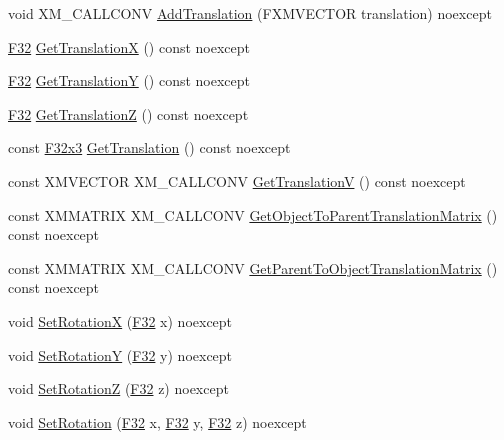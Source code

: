 \begin{DoxyCompactItemize}
\item 
void X\+M\+\_\+\+C\+A\+L\+L\+C\+O\+NV \hyperlink{classmage_1_1_local_transform_a43e89031fcab7af7e7fb1c7d80e06438}{Add\+Translation} (F\+X\+M\+V\+E\+C\+T\+OR translation) noexcept
\item 
\hyperlink{namespacemage_aa97e833b45f06d60a0a9c4fc22ae02c0}{F32} \hyperlink{classmage_1_1_local_transform_ae021c17cf996088044a9c4f7be1601b8}{Get\+TranslationX} () const noexcept
\item 
\hyperlink{namespacemage_aa97e833b45f06d60a0a9c4fc22ae02c0}{F32} \hyperlink{classmage_1_1_local_transform_a31441b5c6cca77b6f0e8c5cc9c3bf3f0}{Get\+TranslationY} () const noexcept
\item 
\hyperlink{namespacemage_aa97e833b45f06d60a0a9c4fc22ae02c0}{F32} \hyperlink{classmage_1_1_local_transform_a09d94a592dab22c23e664402144d75bc}{Get\+TranslationZ} () const noexcept
\item 
const \hyperlink{namespacemage_a73fbe0da4b8d5bc156bb8453e5b63a17}{F32x3} \hyperlink{classmage_1_1_local_transform_a302713192aca919d01e02fb4eac2d2c5}{Get\+Translation} () const noexcept
\item 
const X\+M\+V\+E\+C\+T\+OR X\+M\+\_\+\+C\+A\+L\+L\+C\+O\+NV \hyperlink{classmage_1_1_local_transform_a18dc6111bfca7d24f3f24e2c1dff8d0b}{Get\+TranslationV} () const noexcept
\item 
const X\+M\+M\+A\+T\+R\+IX X\+M\+\_\+\+C\+A\+L\+L\+C\+O\+NV \hyperlink{classmage_1_1_local_transform_a417c97411f3214119a1e7298de4b1631}{Get\+Object\+To\+Parent\+Translation\+Matrix} () const noexcept
\item 
const X\+M\+M\+A\+T\+R\+IX X\+M\+\_\+\+C\+A\+L\+L\+C\+O\+NV \hyperlink{classmage_1_1_local_transform_aa64c46933f029f5952895a185b5fdd29}{Get\+Parent\+To\+Object\+Translation\+Matrix} () const noexcept
\item 
void \hyperlink{classmage_1_1_local_transform_a57f9839911c987f3cfc5b686a80c6624}{Set\+RotationX} (\hyperlink{namespacemage_aa97e833b45f06d60a0a9c4fc22ae02c0}{F32} x) noexcept
\item 
void \hyperlink{classmage_1_1_local_transform_a6fe237d9f56681271273f47b26b89ac0}{Set\+RotationY} (\hyperlink{namespacemage_aa97e833b45f06d60a0a9c4fc22ae02c0}{F32} y) noexcept
\item 
void \hyperlink{classmage_1_1_local_transform_a1dcec183b2f7ebf3fc7eb4ab574ca045}{Set\+RotationZ} (\hyperlink{namespacemage_aa97e833b45f06d60a0a9c4fc22ae02c0}{F32} z) noexcept
\item 
void \hyperlink{classmage_1_1_local_transform_a7f6fbefa501a2111a07d532a823fba6e}{Set\+Rotation} (\hyperlink{namespacemage_aa97e833b45f06d60a0a9c4fc22ae02c0}{F32} x, \hyperlink{namespacemage_aa97e833b45f06d60a0a9c4fc22ae02c0}{F32} y, \hyperlink{namespacemage_aa97e833b45f06d60a0a9c4fc22ae02c0}{F32} z) noexcept

\end{DoxyCompactItemize}
